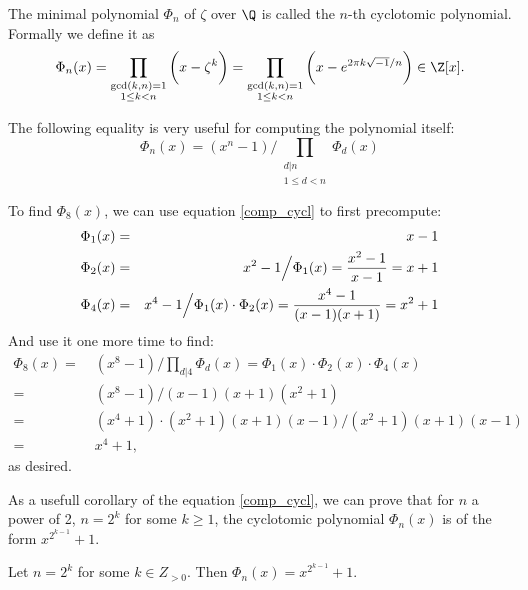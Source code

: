 The minimal polynomial $\Phi_n$ of $\zeta$ over $\Q$ is called the $n$-th cyclotomic polynomial. Formally we define it as 
\[ \Phi_n(x) = \prod_{\substack{\gcd(k,n) = 1 \\ 1 \leq k < n}} \bigg( x - \zeta^k \bigg) = \prod_{\substack{\gcd(k,n) = 1 \\ 1 \leq k < n}} \bigg( x - e^{2\pi k \sqrt{-1}/n} \bigg) \in \Z[x]. \]

The following equality is very useful for computing the polynomial itself:
\begin{equation}\label{comp_cycl} 
	\Phi_n(x) = (x^n - 1) \bigg/ \prod_{\substack{d | n\\ 1 \leq d < n}} \Phi_d(x) 
\end{equation}
\begin{example}
	To find $\Phi_8(x)$, we can use equation \ref{comp_cycl} to first precompute:
  \begin{align*}
	  \Phi_1(x) = & \hfill &  x - 1 \\
	  \Phi_2(x) = & \hfill & x^2-1\Big/\Phi_1(x) = \frac{x^2 - 1}{x-1} = x+1 \\
	  \Phi_4(x) = & \hfill & x^4-1\Big/\Phi_1(x)\cdot \Phi_2(x) = \frac{x^4-1}{(x-1)(x+1)} = x^2 + 1
  \end{align*}
	  And use it one more time to find:
	  \begin{align*}
		  \Phi_8(x) = \; & (x^8 - 1) \Big/ \prod_{{d | 4}} \Phi_d(x) = \Phi_1(x) \cdot \Phi_2(x) \cdot \Phi_4(x) \\
		  = \; & (x^8 - 1) \Big/(x-1)(x+1)(x^2+1) \\
		  = \; & (x^4+1)\cdot (x^2+1)(x+1)(x-1) \Big/(x^2+1)(x+1)(x-1) \\
		  = \; & x^4 +1,
	  \end{align*}
	  as desired.
\end{example}
As a usefull corollary of the equation \ref{comp_cycl}, we can prove that for $n$ a power of 2, $n = 2^k$ for some $k \geq 1$, the cyclotomic polynomial $\Phi_n(x)$ is of the form $x^{2^{k - 1}} + 1$.
\begin{corollary}\label{2k-cycl}
  Let $n= 2^k$ for some $k \in Z_{> 0}$. Then $\Phi_n(x) = x^{2^{k-1}} + 1$.
\end{corollary}
